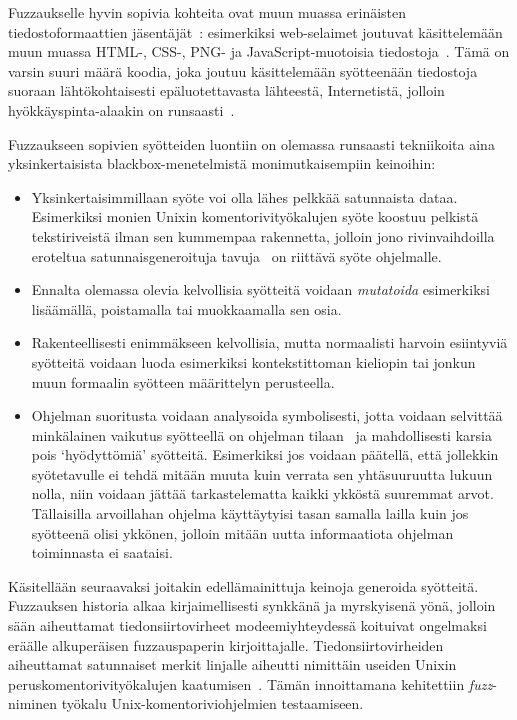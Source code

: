 Fuzzaukselle hyvin sopivia kohteita ovat muun muassa erinäisten tiedostoformaattien jäsentäjät~\cite{SageArtikkeli,OuluBrowser}:
esimerkiksi web-selaimet joutuvat käsittelemään muun muassa
HTML-, CSS-, PNG- ja JavaScript-muotoisia tiedostoja~\cite{OuluBrowser}.
Tämä on varsin suuri määrä koodia,
joka joutuu käsittelemään syötteenään tiedostoja suoraan lähtökohtaisesti epäluotettavasta lähteestä, Internetistä,
jolloin hyökkäyspinta-alaakin on runsaasti~\cite{OuluBrowser}.

Fuzzaukseen sopivien syötteiden luontiin on olemassa runsaasti tekniikoita
aina yksinkertaisista blackbox-menetelmistä monimutkaisempiin keinoihin:
\begin{itemize}
    \item Yksinkertaisimmillaan syöte voi olla lähes pelkkää satunnaista dataa.
          Esimerkiksi monien Unixin komentorivityökalujen syöte koostuu pelkistä tekstiriveistä
          ilman sen kummempaa rakennetta,
          jolloin jono rivinvaihdoilla eroteltua satunnaisgeneroituja
          tavuja~\cite{UnixReliability} on riittävä syöte ohjelmalle.
    \item Ennalta olemassa olevia kelvollisia syötteitä voidaan \emph{mutatoida} esimerkiksi
          lisäämällä, poistamalla tai muokkaamalla sen osia.
    \item Rakenteellisesti enimmäkseen kelvollisia, mutta normaalisti harvoin esiintyviä syötteitä voidaan
          luoda esimerkiksi kontekstittoman kieliopin tai jonkun muun formaalin syötteen määrittelyn perusteella.
    \item Ohjelman suoritusta voidaan analysoida symbolisesti, jotta voidaan
          selvittää minkälainen vaikutus syötteellä on ohjelman tilaan~\cite{SageArtikkeli}
          ja mahdollisesti karsia pois `hyödyttömiä' syötteitä.
          Esimerkiksi jos voidaan päätellä, että jollekkin syötetavulle ei tehdä mitään muuta kuin
          verrata sen yhtäsuuruutta lukuun nolla,
          niin voidaan jättää tarkastelematta kaikki ykköstä suuremmat arvot.
          Tällaisilla arvoillahan ohjelma käyttäytyisi tasan samalla lailla
          kuin jos syötteenä olisi ykkönen,
          jolloin mitään uutta informaatiota ohjelman toiminnasta ei saataisi.

\end{itemize}

Käsitellään seuraavaksi joitakin edellämainittuja keinoja generoida syötteitä.
%
%
Fuzzauksen historia alkaa kirjaimellisesti synkkänä ja myrskyisenä yönä,
jolloin sään aiheuttamat tiedonsiirtovirheet modeemiyhteydessä koituivat ongelmaksi
eräälle alkuperäisen fuzzauspaperin kirjoittajalle.
Tiedonsiirtovirheiden aiheuttamat satunnaiset merkit linjalle aiheutti nimittäin
useiden Unixin peruskomentorivityökalujen kaatumisen~\cite{UnixReliability}.
Tämän innoittamana kehitettiin \emph{fuzz}-niminen työkalu Unix-komentoriviohjelmien testaamiseen.

